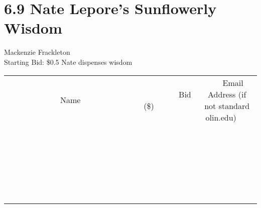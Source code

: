 \documentclass[11pt]{article}
\begin{document}
\section*{6.9 Nate Lepore's Sunflowerly Wisdom}
Mackenzie Frackleton 
\\
Starting Bid: \$0.5
\newline
Nate dispenses wisdom
\\[6ex]
\begin{tabular}{c c c}
~~~~~~~~~~~~~Name~~~~~~~~~~~~~ & ~~~~~~~~~Bid (\$)~~~~~~~~~  & ~~~Email Address (if not standard olin.edu)~~~\\
 & & \\
\hline
 & & \\
\hline
 & & \\
\hline
 & & \\
\hline
 & & \\
\hline
 & & \\
\hline
 & & \\
\hline
 & & \\
\hline
 & & \\
\hline
 & & \\
\hline
 & & \\
\hline
 & & \\
\hline
 & & \\
\hline
 & & \\
\hline
 & & \\
\hline
 & & \\
\hline
 & & \\
\hline
 & & \\
\hline
 & & \\
\hline
 & & \\
\hline
 & & \\
\hline
 & & \\
\hline
 & & \\
\hline
 & & \\
\hline
 & & \\
\hline
 & & \\
\hline
\end{tabular}
\newpage
\end{document}
